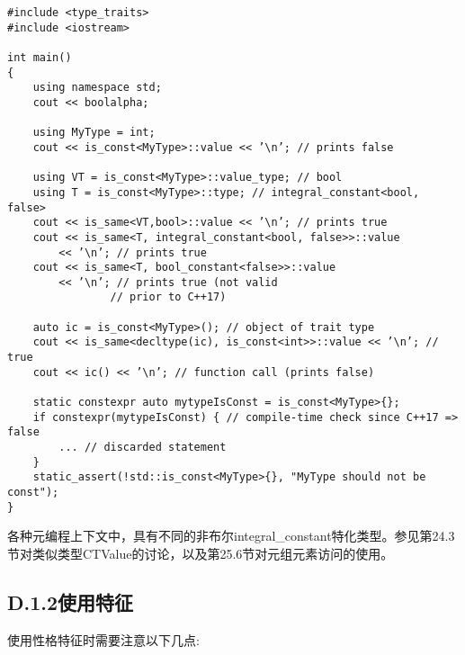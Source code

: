 \begin{lstlisting}[style=styleCXX]
#include <type_traits>
#include <iostream>

int main()
{
	using namespace std;
	cout << boolalpha;
	
	using MyType = int;
	cout << is_const<MyType>::value << ’\n’; // prints false
	
	using VT = is_const<MyType>::value_type; // bool
	using T = is_const<MyType>::type; // integral_constant<bool, false>
	cout << is_same<VT,bool>::value << ’\n’; // prints true
	cout << is_same<T, integral_constant<bool, false>>::value
		<< ’\n’; // prints true
	cout << is_same<T, bool_constant<false>>::value
		<< ’\n’; // prints true (not valid	
				// prior to C++17)
				
	auto ic = is_const<MyType>(); // object of trait type
	cout << is_same<decltype(ic), is_const<int>>::value << ’\n’; // true
	cout << ic() << ’\n’; // function call (prints false)
	
	static constexpr auto mytypeIsConst = is_const<MyType>{};
	if constexpr(mytypeIsConst) { // compile-time check since C++17 => false
		... // discarded statement
	}
	static_assert(!std::is_const<MyType>{}, "MyType should not be const");
}
\end{lstlisting}

各种元编程上下文中，具有不同的非布尔integral\_constant特化类型。参见第24.3节对类似类型CTValue的讨论，以及第25.6节对元组元素访问的使用。

\subsection{D.1.2\hspace{0.2cm}使用特征}

使用性格特征时需要注意以下几点:

